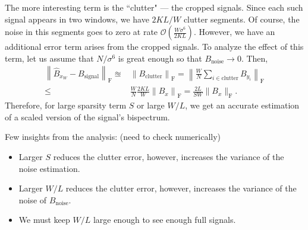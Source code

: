 \documentclass[12pt,a4paper]{article}
\theoremstyle{plain}
\theoremstyle{definition}
\theoremstyle{remark}
\theoremstyle{plain}
\theoremstyle{remark}
\theoremstyle{plain}
\theoremstyle{plain}
\newcommand{\order}[1]{\mathcal{O}\left({#1} \right)}
\begin{document}
 The more interesting term is the ``clutter" --- the cropped signals. Since each such signal appears in two windows,
 we have $2KL/W$ clutter segments. Of course, the noise in this segments goes to zero
 at rate $\order{\frac{W\sigma^6}{2KL}}$. However, we have an additional error term arises from  the cropped signals. To analyze the effect of this term, let us assume that $N/\sigma^6$ is great enough so that $B_\textrm{noise}\to 0$. Then,
\begin{equation}
\begin{split}
\left\| \hat{B}_{x_W} - B_\textrm{signal}\right\|_{\textrm{F}} \approxeq&  \left\|B_\textrm{clutter}\right\|_{\textrm{F}}
= \left\|\frac{W}{N}\sum_{i\in\textrm{clutter}}B_{y_i}\right\|_{\textrm{F}}
\\ \leq & 
\frac{W}{N}\frac{2KL}{W}\left\|B_x\right\|_{\textrm{F}} = \frac{2L}{SW}
\|B_x\|_{\textrm{F}}.
\end{split}
\end{equation}
Therefore, for large sparsity term $S$ or large $W/L$, we get an accurate estimation of a scaled version of the signal's bispectrum. 


Few insights from the analysis: (need to check numerically)
\begin{itemize}
	\item Larger $S$ reduces the clutter error, however, increases the variance of the noise estimation.
	\item Larger $W/L$ reduces the clutter error, however, increases the variance of the noise  of $B_\textrm{noise}$.
	\item We must keep $W/L$ large enough to see enough full signals.    
\end{itemize} 
%
%
\end{document}

